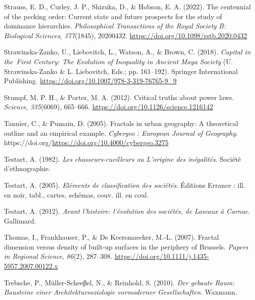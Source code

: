 \documentclass[
  12pt,
]{book}
\newlength{\cslhangindent}
\newlength{\cslentryspacingunit} %
\newenvironment{CSLReferences}[2] %
 {%
  \setlength{\parindent}{0pt}
  \ifodd #1
  \let\oldpar\par
  \def\par{\hangindent=\cslhangindent\oldpar}
  \fi
  \setlength{\parskip}{#2\cslentryspacingunit}
 }%
 {}
\begin{document}
\begin{CSLReferences}{1}{0}
\leavevmode{}%
Strauss, E. D., Curley, J. P., Shizuka, D., \& Hobson, E. A. (2022). The centennial of the pecking order: Current state and future prospects for the study of dominance hierarchies. \emph{Philosophical Transactions of the Royal Society B: Biological Sciences}, \emph{377}(1845), 20200432. \url{https://doi.org/10.1098/rstb.2020.0432}

\leavevmode{}%
Strawinska-Zanko, U., Liebovitch, L., Watson, A., \& Brown, C. (2018). \emph{Capital in the~First Century: The Evolution of Inequality in Ancient Maya Society} (U. Strawinska-Zanko \& L. Liebovitch, Eds.; pp. 161--192). Springer International Publishing. \url{https://doi.org/10.1007/978-3-319-76765-9_9}

\leavevmode{}%
Stumpf, M. P. H., \& Porter, M. A. (2012). Critical truths about power laws. \emph{Science}, \emph{335}(6069), 665--666. \url{https://doi.org/10.1126/science.1216142}

\leavevmode{}%
Tannier, C., \& Pumain, D. (2005). Fractals in urban geography: A theoretical outline and an empirical example. \emph{Cybergeo : European Journal of Geography}. https://doi.org/\url{https://doi.org/10.4000/cybergeo.3275}

\leavevmode{}%
Testart, A. (1982). \emph{Les chasseurs-cueilleurs ou L'origine des inégalités}. Société d'ethnographie.

\leavevmode{}%
Testart, A. (2005). \emph{Eléments de classification des sociétés}. Éditions Errance : ill. en noir, tabl., cartes, schémas, couv. ill. en coul.

\leavevmode{}%
Testart, A. (2012). \emph{Avant l'histoire: l'évolution des sociétés, de Lascaux à Carnac}. Gallimard.

\leavevmode{}%
Thomas, I., Frankhauser, P., \& De Keersmaecker, M.-L. (2007). Fractal dimension versus density of built-up surfaces in the periphery of Brussels. \emph{Papers in Regional Science}, \emph{86}(2), 287--308. \url{https://doi.org/10.1111/j.1435-5957.2007.00122.x}

\leavevmode{}%
Trebsche, P., Müller-Scheeβel, N., \& Reinhold, S. (2010). \emph{Der gebaute Raum: Bausteine einer Architektursoziologie vormoderner Gesellschaften}. Waxmann.


\end{CSLReferences}
\end{document}
